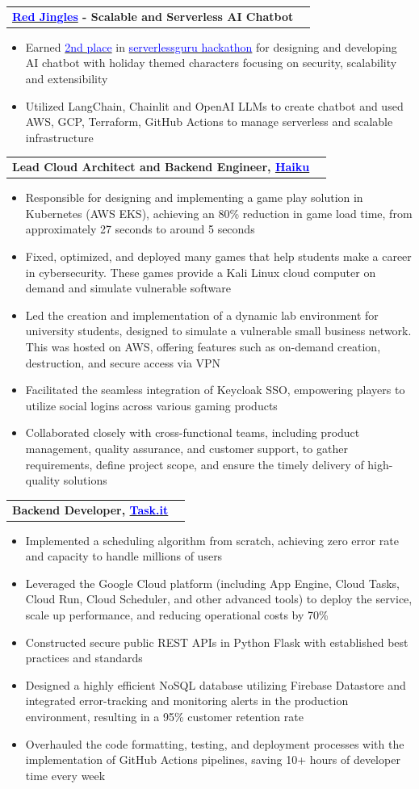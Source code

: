 \documentclass[letterpaper,11pt]{article}
\makeatletter
\newcommand{\resumeItem}[1]{
  \item\small{
    {#1 \vspace{-2pt}}
  }
}
\newcommand{\resumeProjectHeading}[2]{
    \vspace{-2pt}\item
    \begin{tabular*}{0.97\textwidth}{l@{\extracolsep{\fill}}r}
      \small#1 & #2 \\
    \end{tabular*}\vspace{-7pt}
}
\newcommand{\resumeItemListStart}{\begin{itemize}}
\newcommand{\resumeItemListEnd}{\end{itemize}\vspace{-5pt}}
\makeatother
\begin{document}
\resumeProjectHeading
{\textbf{{\href{https://github.com/jbhv12/red-jingles}{\textcolor{blue}{Red Jingles}}} - Scalable and Serverless AI Chatbot} \emph}{}
\resumeItemListStart
\resumeItem{Earned {\href{https://www.linkedin.com/posts/serverlessguru_the-serverless-holiday-hackathon-is-over-activity-7152772593165459456-9yzN}{\textcolor{blue}{2nd place}}} in {\href{https://hackathon.serverless.guru}{\textcolor{blue}{serverlessguru hackathon}}} for designing and developing AI chatbot with holiday themed characters focusing on security, scalability and extensibility}
\resumeItem{Utilized LangChain, Chainlit and OpenAI LLMs to create chatbot and used AWS, GCP, Terraform, GitHub Actions to manage serverless and scalable infrastructure }
\resumeItemListEnd

\resumeProjectHeading
{\textbf{Lead Cloud Architect and Backend Engineer, {\href{https://haikuinc.io/}{\textcolor{blue}{Haiku}}}} \emph}{}
\resumeItemListStart
\resumeItem{Responsible for designing and implementing a game play solution in Kubernetes (AWS EKS), achieving an 80\% reduction in game load time, from approximately 27 seconds to around 5 seconds}
\resumeItem{Fixed, optimized, and deployed many games that help students make a career in cybersecurity. These games provide a Kali Linux cloud computer on demand and simulate vulnerable software}
\resumeItem{Led the creation and implementation of a dynamic lab environment for university students, designed to simulate a vulnerable small business network. This was hosted on AWS, offering features such as on-demand creation, destruction, and secure access via VPN}
\resumeItem{Facilitated the seamless integration of Keycloak SSO, empowering players to utilize social logins across various gaming products}
\resumeItem{Collaborated closely with cross-functional teams, including product management, quality assurance, and customer support, to gather requirements, define project scope, and ensure the timely delivery of high-quality solutions}
\resumeItemListEnd

\resumeProjectHeading
{\textbf{Backend Developer, {\href{https://www.task.it/}{\textcolor{blue}{Task.it}}}} \emph}{}
\resumeItemListStart
\resumeItem{Implemented a scheduling algorithm from scratch, achieving zero error rate and capacity to handle millions of users}
\resumeItem{Leveraged the Google Cloud platform (including App Engine, Cloud Tasks, Cloud Run, Cloud Scheduler, and other advanced tools) to deploy the service, scale up performance, and reducing operational costs by 70\%}
\resumeItem {Constructed secure public REST APIs in Python Flask with established best practices and standards}
\resumeItem{Designed a highly efficient NoSQL database utilizing Firebase Datastore and integrated error-tracking and monitoring alerts in the production environment, resulting in a 95\% customer retention rate}
\resumeItem{Overhauled the code formatting, testing, and deployment processes with the implementation of GitHub Actions pipelines, saving 10+ hours of developer time every week} 
\resumeItemListEnd
\end{document}

